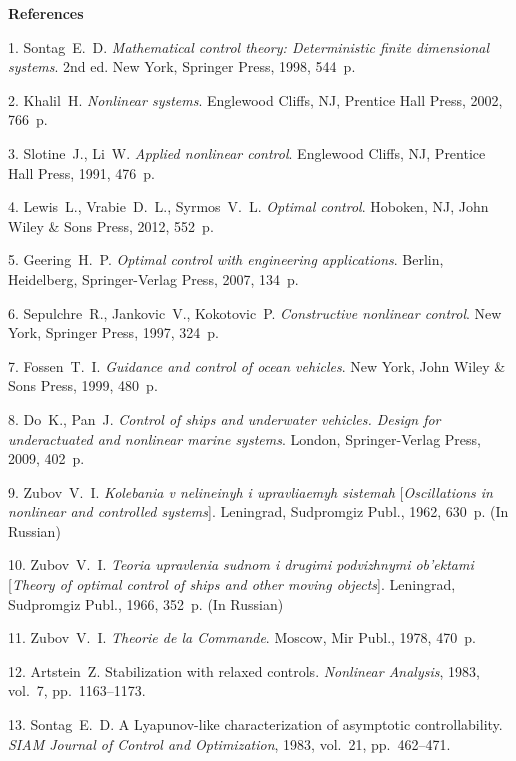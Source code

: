 

{\small



\vskip6mm

\noindent \textbf{References} }

\vskip 2mm

{\footnotesize



{1}. Sontag~E.~D. \textit {Mathematical control theory:
Deterministic finite dimensional systems}. 2nd ed. New York,
Springer Press, 1998, 544~p.

{2}. Khalil~H. \textit {Nonlinear systems}. Englewood Cliffs, NJ,
Prentice Hall Press, 2002, 766~p.

{3}. Slotine~J., Li~W. {\it Applied nonlinear control}. Englewood
Cliffs, NJ, Prentice Hall Press,   1991, 476~p.

{4}. Lewis~L., Vrabie~D.~L., Syrmos~V.~L. {\it Optimal control}.
Hoboken, NJ, John Wiley \& Sons Press,  2012, 552~p.

{5}. Geering~H.~P. {\it Optimal control with engineering
applications}. Berlin, Heidelberg,  Springer-Verlag Press, 2007,
134~p.

{6}. Sepulchre~R., Jankovic~V., Kokotovic~P. {\it Constructive
nonlinear control}.  New York, Springer Press, 1997, 324~p.

{7}. Fossen~T.~I. {\it Guidance and control of ocean vehicles}.
New York, John Wiley \& Sons Press, 1999, 480~p.

{8}. Do~K., Pan~J. {\it Control of ships and underwater vehicles.
Design for underactuated and nonlinear marine systems}. London,
Springer-Verlag Press, 2009, 402~p.

{9}. Zubov~V.~I.  {\it Kolebania v nelineinyh i upravliaemyh
sistemah} [{\it Oscillations in nonlinear and controlled
systems}]. Leningrad, Sudpromgiz Publ., 1962, 630~p. (In Russian)

{10}. Zubov~V.~I.  {\it Teoria upravlenia sudnom i drugimi
podvizhnymi ob'ektami} [{\it Theory of optimal control of ships
and other moving objects}]. Leningrad, Sudpromgiz Publ., 1966,
352~p. (In Russian)

{11}. Zubov~V.~I. {\it Theorie de la Commande}. Moscow, Mir Publ.,
1978, 470~p.

{12}. Artstein~Z. Stabilization with relaxed controls. \textit
{Nonlinear Analysis}, 1983, vol.~7, pp.~1163--1173.

{13}. Sontag~E.~D. A Lyapunov-like characterization of asymptotic
controllability.     \textit {SIAM Journal of Control and
Optimization}, 1983, vol.~21, pp.~462--471.

}
